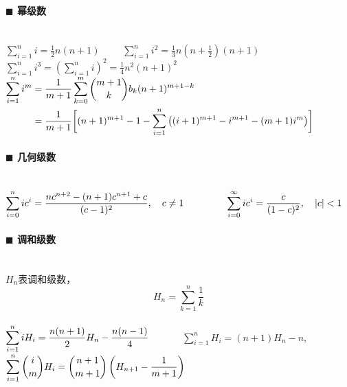 \paragraph{$\blacksquare$ 幂级数}
\noindent \\
${\displaystyle \sum_{i=1}^n i=\frac{1}{2}n(n+1)}$~~~~
${\displaystyle \sum_{i=1}^n i^2=\frac{1}{3}n(n+\frac{1}{2})(n+1)}$~~~~
${\displaystyle \sum_{i=1}^n i^3=(\sum_{i=1}^n i)^2=\frac{1}{4}n^2 (n+1)^2}$\\
$\begin{aligned} \sum_{i=1}^n i^m &=  {1 \over m+1}\sum_{k=0}^m {m+1 \choose k} b_k (n+1)^{m+1-k} \\ &= {1 \over m+1} \bigg[ (n+1)^{m+1} - 1 - \sum_{i=1}^n \big((i+1)^{m+1} - i^{m+1} - (m+1)i^m\big) \bigg]\end{aligned}$
\paragraph{$\blacksquare$ 几何级数}
\noindent \\
${\displaystyle \sum_{i=0}^n i c^i = { nc^{n+2} - (n+1)c^{n+1} + c \over (c-1)^2}, \quad c \neq 1}$~~~~~~
${\displaystyle \quad \sum_{i=0}^\infty i c^i = {c \over (1 - c)^2}, \quad \vert c \vert < 1}$
\paragraph{$\blacksquare$ 调和级数}
\noindent \\
$H_n$表调和级数，$${\displaystyle H_n=\sum _{k=1}^{n} \frac{1}{k}}$$\\
${\displaystyle \sum_{i=1}^n iH_i = {n(n+1) \over 2}H_n - {n(n-1) \over 4}}$~~~~~~
${\displaystyle \sum_{i=1}^n H_i = (n+1)H_n - n, \quad}$\\
${\displaystyle \sum_{i=1}^n {i \choose m } H_i = { n+1 \choose m+1} \left(H_{n+1} - {1 \over m+1}\right)}$\\
